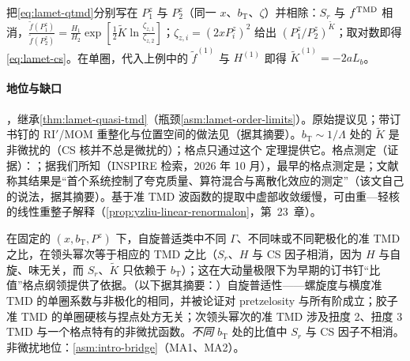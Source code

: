 \begin{proofsketch}
把\cref{eq:lamet-qtmd}分别写在 $P_1^z$ 与 $P_2^z$（同一 $x$、$b_{\mathrm T}$、$\zeta$）并相除：$S_r$ 与 $f^{\rm TMD}$ 相消，$\frac{\tilde f(P_1^z)}{\tilde f(P_2^z)}=\frac{H_1}{H_2}\exp[\frac12\tilde K\ln\frac{\zeta_{z,1}}{\zeta_{z,2}}]$；$\zeta_{z,i}=(2xP^z_i)^2$ 给出 $(P_1^z/P_2^z)^{\tilde K}$；取对数即得\cref{eq:lamet-cs}。在单圈，代入上例中的 $\tilde f^{(1)}$ 与 $H^{(1)}$ 即得 $\tilde K^{(1)}=-2aL_b$。
\end{proofsketch}

\paragraph{地位与缺口}
\tagA，继承\cref{thm:lamet-quasi-tmd}（瓶颈\cref{asm:lamet-order-limits}）。原始提议见\cite{EbertStewartZhao2019}；带订书钉的 RI$'$/MOM 重整化与位置空间的做法见\cite{Ebert:2019tvc}（据其摘要）。$b_{\mathrm T}\sim1/\Lambda$ 处的 $\tilde K$ 是非微扰的（CS 核并不总是微扰的）；格点只通过这个 \tagA 定理提供它。格点测定（证据）：\cite{Shanahan:2020zxr,Shanahan:2021tst,Schlemmer:2021aij,LatticePartonLPC:2022eev,LatticePartonLPC:2023pdv,Avkhadiev:2023poz,Avkhadiev:2024mgd,Bollweg:2024zet,Tan:2025ofx}；据我们所知（INSPIRE 检索，2026 年 10 月），最早的格点测定是\cite{Shanahan:2020zxr}；文献\cite{Avkhadiev:2024mgd}称其结果是“首个系统控制了夸克质量、算符混合与离散化效应的测定”（该文自己的说法，据其摘要）。基于准 TMD 波函数的提取中虚部收敛缓慢，可由重—轻核的线性重整子解释（\cref{prop:yzliu-linear-renormalon}，第~23~章）。

\begin{proposition}\label{prop:lamet-tmd-ratios}
在固定的 $(x,b_{\mathrm T},P^z)$ 下，自旋普适类中不同 $\Gamma$、不同味或不同靶极化的准 TMD 之比，在领头幂次等于相应的 TMD 之比（$S_r$、$H$ 与 CS 因子相消，因为 $H$ 与自旋、味无关，而 $S_r$、$\tilde K$ 只依赖于 $b_{\mathrm T}$）；这在大动量极限下为早期的订书钉“比值”格点纲领\cite{Hagler:2009mb,Musch:2010ka,Musch:2011er,Yoon:2017qzo}提供了依据\cite{Ebert:2022fmh,Vladimirov:2020ofp}。（以下据其摘要：）自旋普适性——螺旋度与横度准 TMD 的单圈系数与非极化的相同，并被论证对 pretzelosity 与所有阶成立\cite{Ebert:2020gxr}；胶子准 TMD 的单圈硬核与捏点处方无关\cite{Zhu:2022bja}；次领头幂次的准 TMD 涉及扭度 2、扭度 3 TMD 与一个格点特有的非微扰函数\cite{Rodini:2022wic}。\emph{不同} $b_{\mathrm T}$ 处的比值中 $S_r$ 与 CS 因子不相消。
非微扰地位：\cref{asm:intro-bridge}（MA1、MA2）。
\end{proposition}

